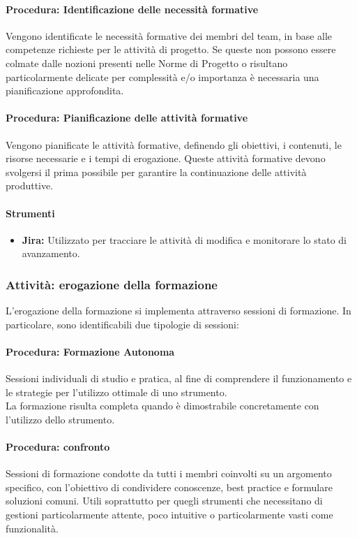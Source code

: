 \documentclass[a4paper,12pt]{article}
\begin{document}
\paragraph{Procedura: Identificazione delle necessità formative}
Vengono identificate le necessità formative dei membri del team, in base alle
competenze richieste per le attività di progetto. Se queste non possono essere
colmate dalle nozioni presenti nelle Norme di Progetto o risultano
particolarmente delicate per complessità e/o importanza è necessaria una
pianificazione approfondita.
\paragraph{Procedura: Pianificazione delle attività formative}
Vengono pianificate le attività formative, definendo gli obiettivi, i
contenuti, le risorse necessarie e i tempi di erogazione. Queste attività
formative devono svolgersi il prima possibile per garantire la continuazione
delle attività produttive.
\paragraph{Strumenti}
\begin{itemize}
    \item \textbf{Jira:} Utilizzato per tracciare le attività di modifica e monitorare lo stato di avanzamento.
\end{itemize}

\subsubsection{Attività: erogazione della formazione}
L'erogazione della formazione si implementa attraverso sessioni di formazione.
In particolare, sono identificabili due tipologie di sessioni:

\paragraph{Procedura: Formazione Autonoma}
Sessioni individuali di studio e pratica, al fine di comprendere il
funzionamento e le strategie per l'utilizzo ottimale di uno strumento. \\La
formazione risulta completa quando è dimostrabile concretamente con l'utilizzo
dello strumento.
\paragraph{Procedura: confronto}
Sessioni di formazione condotte da tutti i membri coinvolti su un argomento
specifico, con l'obiettivo di condividere conoscenze, best practice e formulare
soluzioni comuni. Utili soprattutto per quegli strumenti che necessitano di
gestioni particolarmente attente, poco intuitive o particolarmente vasti come
funzionalità.
\end{document}
